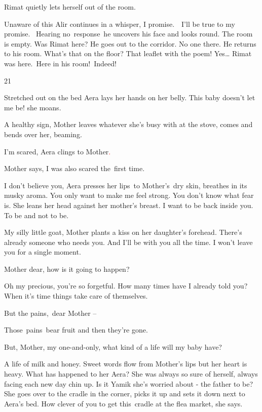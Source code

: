 \documentclass[letterpaper]{article}
\begin{document}
Rimat quietly lets herself out of the room.

Unaware of this Alir continues in a whisper, {\textquotedbl}I promise.\ \ I'll be true to my promise.{\textquotedbl}~
Hearing no\ response\ he uncovers his face and looks round. The room is empty. Was Rimat here? He goes out to the
corridor. No one there. He returns to his room. What's that on the floor? That leaflet with the poem! Yes{\dots} Rimat
was here.\ Here in his room!\ Indeed!


\bigskip

21 

Stretched out on the bed Aera lays her hands on her belly. {\textquotedbl}This baby doesn't let me be!{\textquotedbl}
she moans.

{\textquotedbl}A healthy sign,{\textquotedbl} Mother leaves whatever she's busy with at the stove, comes and bends over
her, beaming. 

{\textquotedbl}I'm scared,{\textquotedbl} Aera clings to Mother\textcolor{red}{.}

Mother says, {\textquotedbl}I was also scared the\textcolor{red}{\ }first time.{\textquotedbl} 

{\textquotedbl}I don't believe you,{\textquotedbl} Aera presses her lips\textcolor{red}{\ }to Mother's~dry skin,
breathes in its musky aroma. {\textquotedbl}You only want to make me feel strong. You don't know what fear
is.{\textquotedbl} She leans her head against her mother's breast. {\textquotedbl}I want to be back inside you. To be
and not to be.{\textquotedbl} 

{\textquotedbl}My silly little goat,{\textquotedbl} Mother plants a kiss on her daughter's forehead.
{\textquotedbl}There's already someone who needs you. And I'll be with you all the time. I won't leave you for a single
moment.{\textquotedbl} 

{\textquotedbl}Mother dear, how is it going to happen?{\textquotedbl} 

{\textquotedbl}Oh my precious, you're so forgetful. How many times have I already told you? When it's time things take
care of themselves.{\textquotedbl} 

{\textquotedbl}But the pains,~dear Mother -- {\textquotedbl} 

{\textquotedbl}Those~pains~bear fruit and then they're gone.{\textquotedbl} 

{\textquotedbl}But, Mother, my one-and-only, what kind of a life will my baby have?{\textquotedbl} 

{\textquotedbl}A life of milk and honey.{\textquotedbl} Sweet words flow from Mother's lips but her heart is heavy. What
has happened to her Aera? She was always so sure of herself, always facing each new day chin up. Is it Yamik she's
worried about - the father to be? She goes over to the cradle in the corner, picks it up and sets it down next to
Aera's bed. {\textquotedbl}How clever of you to get this\ cradle at the flea market,{\textquotedbl} she says.
\end{document}
